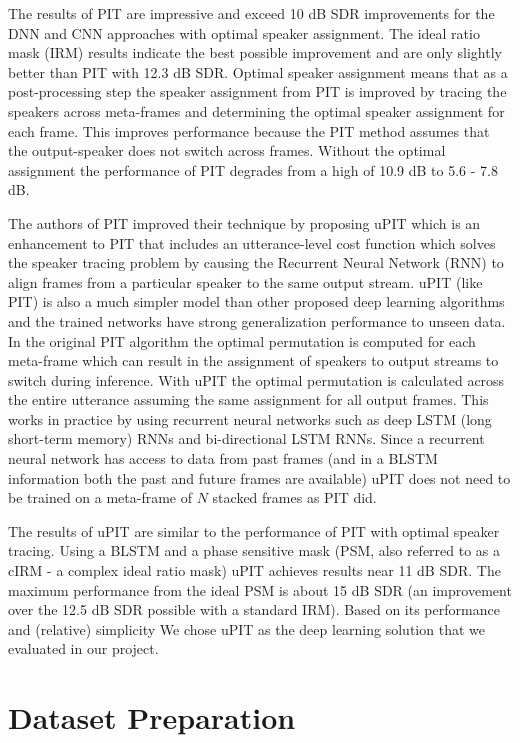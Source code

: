 \documentclass[journal, a4paper]{IEEEtran}
\begin{document}
The results of PIT are impressive and exceed 10 dB SDR improvements for the DNN and CNN approaches with optimal speaker assignment. The ideal ratio mask (IRM) results indicate the best possible improvement and are only slightly better than PIT with 12.3 dB SDR. Optimal speaker assignment means that as a post-processing step the speaker assignment from PIT is improved by tracing the speakers across meta-frames and determining the optimal speaker assignment for each frame. This improves performance because the PIT method assumes that the output-speaker does not switch across frames. Without the optimal assignment the performance of PIT degrades from a high of 10.9 dB to 5.6 - 7.8 dB.


The authors of PIT improved their technique by proposing uPIT which is an enhancement to PIT that includes an utterance-level cost function which solves the speaker tracing problem by causing the Recurrent Neural Network (RNN) to align frames from a particular speaker to the same output stream. uPIT (like PIT) is also a much simpler model than other proposed deep learning algorithms and the trained networks have strong generalization performance to unseen data. In the original PIT algorithm the optimal permutation is computed for each meta-frame which can result in the assignment of speakers to output streams to switch during inference. With uPIT the optimal permutation is calculated across the entire utterance assuming the same assignment for all output frames. This works in practice by using recurrent neural networks such as deep LSTM (long short-term memory) RNNs and bi-directional LSTM RNNs. Since a recurrent neural network has access to data from past frames (and in a BLSTM information both the past and future frames are available) uPIT does not need to be trained on a meta-frame of $N$ stacked frames as PIT did.

The results of uPIT are similar to the performance of PIT with optimal speaker tracing. Using a BLSTM and a phase sensitive mask (PSM, also referred to as a cIRM - a complex ideal ratio mask) uPIT achieves results near 11 dB SDR. The maximum performance from the ideal PSM is about 15 dB SDR (an improvement over the 12.5 dB SDR possible with a standard IRM). Based on its performance and (relative) simplicity We chose uPIT as the deep learning solution that we evaluated in our project.


\section{Dataset Preparation}
\end{document}
